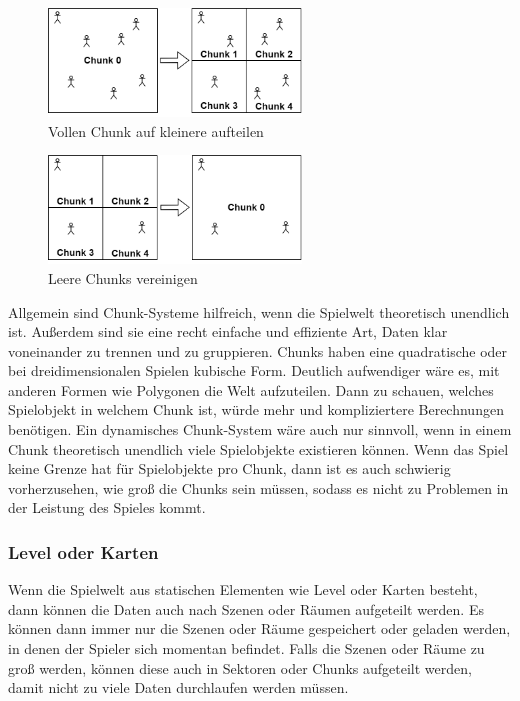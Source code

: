 \begin{figure}[htp]
    \centering
    \includegraphics[width=0.6\textwidth]{images/chunkSplitting.png}
    \caption{Vollen Chunk auf kleinere aufteilen}
    \label{fig:chunkSplitting}
\end{figure}

\begin{figure}[htp]
    \centering
    \includegraphics[width=0.6\textwidth]{images/chunkJoining.png}
    \caption{Leere Chunks vereinigen}
    \label{fig:chunkJoining}
\end{figure}

Allgemein sind Chunk-Systeme hilfreich, wenn die Spielwelt theoretisch unendlich ist. Außerdem sind sie eine recht einfache und effiziente Art, Daten klar voneinander zu trennen und zu gruppieren. Chunks haben eine quadratische oder bei dreidimensionalen Spielen kubische Form. Deutlich aufwendiger wäre es, mit anderen Formen wie Polygonen die Welt aufzuteilen. Dann zu schauen, welches Spielobjekt in welchem Chunk ist, würde mehr und kompliziertere Berechnungen benötigen. Ein dynamisches Chunk-System wäre auch nur sinnvoll, wenn in einem Chunk theoretisch unendlich viele Spielobjekte existieren können. Wenn das Spiel keine Grenze hat für Spielobjekte pro Chunk, dann ist es auch schwierig vorherzusehen, wie groß die Chunks sein müssen, sodass es nicht zu Problemen in der Leistung des Spieles kommt. 

\subsubsection{Level oder Karten}
Wenn die Spielwelt aus statischen Elementen wie Level oder Karten besteht, dann können die Daten auch nach Szenen oder Räumen aufgeteilt werden. Es können dann immer nur die Szenen oder Räume gespeichert oder geladen werden, in denen der Spieler sich momentan befindet. Falls die Szenen oder Räume zu groß werden, können diese auch in Sektoren oder Chunks aufgeteilt werden, damit nicht zu viele Daten durchlaufen werden müssen.    


